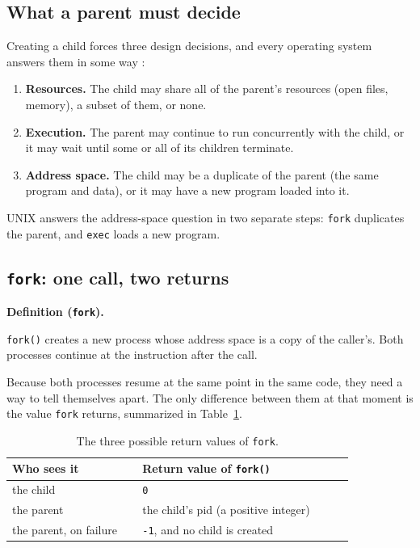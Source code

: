 \documentclass[11pt]{article}
\newenvironment{definitionbox}[1]{%
  \par\noindent\textbf{Definition (#1).}\ \itshape
}{\par\vspace{0.3em}}
\begin{document}
\subsection{What a parent must decide}

Creating a child forces three design decisions, and every operating system
answers them in some way \cite{SilberschatzOSC_operating_system_concepts}:

\begin{enumerate}
  \item \textbf{Resources.} The child may share all of the parent's resources
    (open files, memory), a subset of them, or none.
  \item \textbf{Execution.} The parent may continue to run concurrently with
    the child, or it may wait until some or all of its children terminate.
  \item \textbf{Address space.} The child may be a duplicate of the parent
    (the same program and data), or it may have a new program loaded into it.
\end{enumerate}

\noindent UNIX answers the address-space question in two separate steps:
\texttt{fork} duplicates the parent, and \texttt{exec} loads a new program.

\subsection{\texttt{fork}: one call, two returns}

\begin{definitionbox}{\texttt{fork}}
\texttt{fork()} creates a new process whose address space is a copy of the
caller's. Both processes continue at the instruction after the call.
\end{definitionbox}

Because both processes resume at the same point in the same code, they need a
way to tell themselves apart. The only difference between them at that moment
is the value \texttt{fork} returns, summarized in Table~\ref{tab:fork-return}.

\begin{table}[h]
\centering
\renewcommand{\arraystretch}{1.3}
\begin{tabular}{@{}p{0.32\linewidth}p{0.52\linewidth}@{}}
\toprule
\textbf{Who sees it} & \textbf{Return value of \texttt{fork()}} \\
\midrule
the child & \texttt{0} \\
the parent & the child's pid (a positive integer) \\
the parent, on failure & \texttt{-1}, and no child is created \\
\bottomrule
\end{tabular}
\caption{The three possible return values of \texttt{fork}.}
\label{tab:fork-return}
\end{table}
\end{document}
